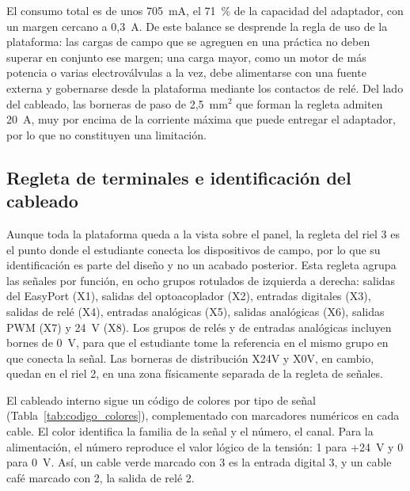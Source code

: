\documentclass[12pt,a4paper,oneside]{report}
\begin{document}
El consumo total es de unos 705~mA, el 71~\% de la capacidad del adaptador, con un margen cercano a 0,3~A. De este balance se desprende la regla de uso de la plataforma: las cargas de campo que se agreguen en una práctica no deben superar en conjunto ese margen; una carga mayor, como un motor de más potencia o varias electroválvulas a la vez, debe alimentarse con una fuente externa y gobernarse desde la plataforma mediante los contactos de relé. Del lado del cableado, las borneras de paso de 2,5~mm$^2$ que forman la regleta admiten 20~A, muy por encima de la corriente máxima que puede entregar el adaptador, por lo que no constituyen una limitación.

\subsection{Regleta de terminales e identificación del cableado}
\label{subsec:hw_terminales}

Aunque toda la plataforma queda a la vista sobre el panel, la regleta del riel 3 es el punto donde el estudiante conecta los dispositivos de campo, por lo que su identificación es parte del diseño y no un acabado posterior. Esta regleta agrupa las señales por función, en ocho grupos rotulados de izquierda a derecha: salidas del EasyPort (X1), salidas del optoacoplador (X2), entradas digitales (X3), salidas de relé (X4), entradas analógicas (X5), salidas analógicas (X6), salidas PWM (X7) y 24~V (X8). Los grupos de relés y de entradas analógicas incluyen bornes de 0~V, para que el estudiante tome la referencia en el mismo grupo en que conecta la señal. Las borneras de distribución X24V y X0V, en cambio, quedan en el riel 2, en una zona físicamente separada de la regleta de señales.

El cableado interno sigue un código de colores por tipo de señal (Tabla~\ref{tab:codigo_colores}), complementado con marcadores numéricos en cada cable. El color identifica la familia de la señal y el número, el canal. Para la alimentación, el número reproduce el valor lógico de la tensión: 1 para +24~V y 0 para 0~V. Así, un cable verde marcado con 3 es la entrada digital 3, y un cable café marcado con 2, la salida de relé 2.
\end{document}
